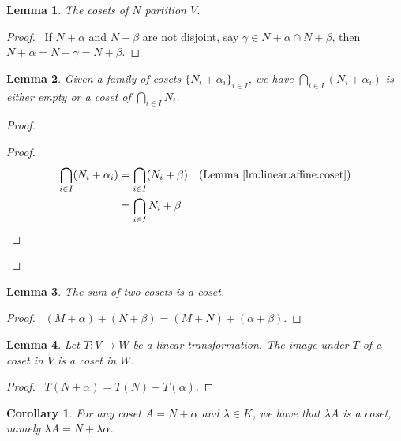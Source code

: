 \documentclass{book}
\let\qed\relax
\newtheorem{lm}{Lemma}[chapter]
\newtheorem{cor}{Corollary}[lm]
\theoremstyle{definition}
\begin{document}
  \begin{lm}
    The cosets of $N$ partition $V$.
  \end{lm}
  
  \begin{proof}
    \pf\ If $N + \alpha$ and $N + \beta$ are not disjoint, say $\gamma \in N + 
    \alpha \cap N + \beta$, then $N + \alpha = N + \gamma = N + \beta$. \qed
  \end{proof}
  
  \begin{lm}
    Given a family of cosets $\{ N_i + \alpha_i \}_{i \in I}$, we have
    $\bigcap_{i \in I} (N_i + \alpha_i)$ is either empty or a coset of 
    $\bigcap_{i \in I} N_i$.
  \end{lm}
  
  \begin{proof}
    \pf
    \begin{proof}
      \pf
      \begin{align*}
        \bigcap_{i \in I} (N_i + \alpha_i) & = \bigcap_{i \in I} (N_i + \beta) 
        & 
        (\text{Lemma \ref{lm:linear:affine:coset}}) \\
        & = \bigcap_{i \in I} N_i + \beta
      \end{align*}
    \end{proof}
  \end{proof}
  
  \begin{lm}
    The sum of two cosets is a coset.
  \end{lm}
  
  \begin{proof}
    \pf\ $(M + \alpha) + (N + \beta) = (M + N) + (\alpha + \beta)$. \qed
  \end{proof}
  
  \begin{lm}
    Let $T : V \rightarrow W$ be a linear transformation. The image under $T$ of 
    a 
    coset in $V$ is a coset in $W$.
  \end{lm}
  
  \begin{proof}
    \pf\ $T(N + \alpha) = T(N) + T(\alpha)$. \qed
  \end{proof}
  
  \begin{cor}
    For any coset $A = N + \alpha$ and $\lambda \in K$, we have that $\lambda 
    A$ 
    is a coset, namely $\lambda A = N + \lambda \alpha$.
  \end{cor}
  
\end{document}
